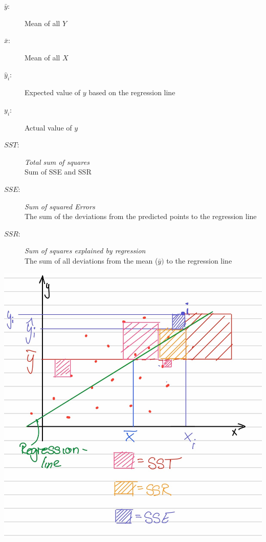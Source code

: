 \documentclass[11pt]{article}
\begin{document}
\begin{minipage}{0.4\textwidth}
    \begin{description}
        \item[$\bar y$:] Mean of all $Y$
        \item[$\bar x$:] Mean of all $X$
        \item[$\hat y_{i}$:] Expected value of $y$ based on the regression line
        \item[$y_{i}$:] Actual value of $y$
        \item[$SST:$] \textit{Total sum of squares} \\
              Sum of SSE and SSR
        \item[$SSE:$ ] \textit{Sum of squared Errors} \\
              The sum of the deviations from the predicted points to the regression line
        \item[$SSR:$ ] \textit{Sum of squares explained by regression} \\
              The sum of all deviations from the mean ($\bar y)$ to the regression line
    \end{description}
\end{minipage} \hfill
\begin{minipage}{0.6\textwidth}
    \includegraphics[keepaspectratio=true,width=\textwidth]{SST.JPG}
\end{minipage}
\end{document}
